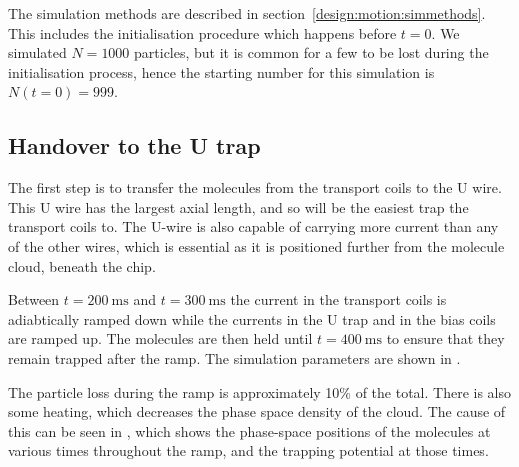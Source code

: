 The simulation methods are described in section~\ref{design:motion:simmethods}. This
includes the initialisation procedure which happens before $t=0$. We simulated
$N=1000$ particles, but it is common for a few to be lost during the
initialisation process, hence the starting number for this simulation is
$N(t=0)=999$.

\subsection{Handover to the U trap}
\label{design:sim:trans_U}


%
The first step is to transfer the molecules from the transport coils to the U
wire. This U wire has the largest axial length, and so will be the easiest trap
the transport coils to. The U-wire is also capable of carrying more current
than any of the other wires, which is essential as it is positioned further
from the molecule cloud, beneath the chip.

Between $t=\SI{200}{\milli\second}$ and $t=\SI{300}{\milli\second}$ the current
in the transport coils is adiabtically ramped down while the currents in
the U trap and in the bias coils are ramped up. The molecules are then held
until $t=\SI{400}{\milli\second}$ to ensure that they remain trapped after the
ramp. The simulation parameters are shown in
.

The particle loss during the ramp is approximately 10\% of the total. There is
also some heating, which decreases the phase space density of the cloud. The
cause of this can be seen in , which shows the
phase-space positions of the molecules at various times throughout the ramp,
and the trapping potential at those times.

